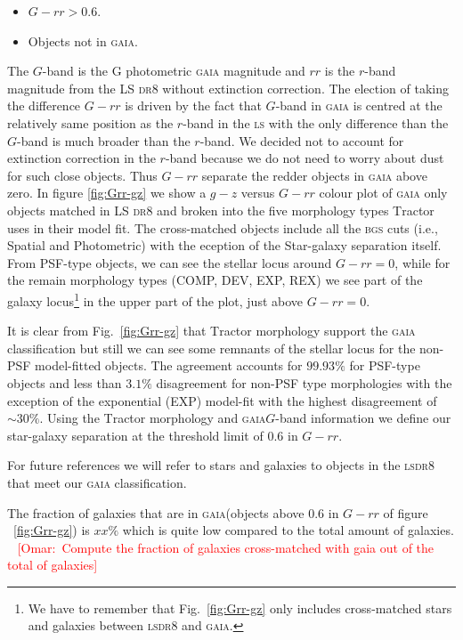 \documentclass[fleqn,usenatbib]{mnras}
\newcommand{\omar}[1]{~\newline\noindent \textcolor{red}{{ [Omar:~{#1}]\\}}}
\newcommand{\BGS}{\textsc{bgs}\xspace}
\newcommand{\DReight}{\textsc{dr8}\xspace}
\newcommand{\GAIA}{\textsc{gaia}\xspace}
\newcommand{\LS}{\textsc{ls}\xspace}
\newcommand{\TRACTOR}{\textsc{T}ractor\xspace}
\begin{document}
\begin{itemize}
    \item $G-rr > 0.6$.
    \item Objects not in \GAIA.
\end{itemize}

The $G$-band is the G photometric \GAIA magnitude and $rr$ is the $r$-band magnitude from the LS \DReight without extinction correction. The election of taking the difference $G-rr$ is driven by the fact that $G$-band in \GAIA is centred at the relatively same position as the $r$-band in the \LS with the only difference than the $G$-band is much broader than the $r$-band. We decided not to account for extinction correction in the $r$-band because we do not need to worry about dust for such close objects. Thus $G-rr$ separate the redder objects in \GAIA above zero. In figure \ref{fig:Grr-gz} we show a $g-z$ versus $G-rr$ colour plot of \GAIA only objects matched in LS \DReight and broken into the five morphology types \TRACTOR uses in their model fit. The cross-matched objects include all the \BGS cuts (i.e., Spatial and Photometric) with the eception of the Star-galaxy separation itself. From PSF-type objects, we can see the stellar locus around $G-rr=0$, while for the remain morphology types (COMP, DEV, EXP, REX) we see part of the galaxy locus\footnote{We have to remember that Fig.~\ref{fig:Grr-gz} only includes cross-matched stars and galaxies between \LS \DReight and \GAIA.} in the upper part of the plot, just above $G-rr=0$. 

It is clear from Fig.~\ref{fig:Grr-gz} that \TRACTOR morphology support the \GAIA classification but still we can see some remnants of the stellar locus for the non-PSF model-fitted objects. The agreement accounts for $99.93 \%$ for PSF-type objects and less than $3.1 \%$ disagreement for non-PSF type morphologies with the exception of the exponential (EXP) model-fit with the highest disagreement of $\sim 30 \%$. Using the \TRACTOR morphology and \GAIA $G$-band information we define our star-galaxy separation at the threshold limit of $0.6$ in $G-rr$. 

For future references we will refer to stars and galaxies to objects in the \LS \DReight that meet our \GAIA classification. 

The fraction of galaxies that are in \GAIA (objects above $0.6$ in $G-rr$ of figure ~\ref{fig:Grr-gz}) is $xx \%$ which is quite low compared to the total amount of galaxies.
\omar{Compute the fraction of galaxies cross-matched with gaia out of the total of galaxies}
\end{document}
